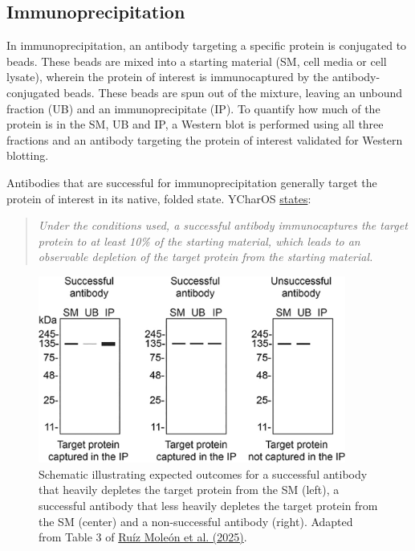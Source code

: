\documentclass[letterpaper, 12pt]{article}
\begin{document}
\pagebreak

\subsection*{Immunoprecipitation}

In immunoprecipitation, an antibody targeting a specific protein is conjugated to beads. These beads are mixed into a starting material (SM, cell media or cell lysate), wherein the protein of interest is immunocaptured by the antibody-conjugated beads. These beads are spun out of the mixture, leaving an unbound fraction (UB) and an immunoprecipitate (IP). To quantify how much of the protein is in the SM, UB and IP, a Western blot is performed using all three fractions and an antibody targeting the protein of interest validated for Western blotting.

Antibodies that are successful for immunoprecipitation generally target the protein of interest in its native, folded state. YCharOS \href{https://f1000research.com/gateways/ycharos/faqs}{states}:

\begin{quote}
    \textit{Under the conditions used, a successful antibody immunocaptures the target protein to at least 10\% of the starting material, which leads to an observable depletion of the target protein from the starting material.}
\end{quote}

\begin{figure}[h!tbp]
    \centering
    \includegraphics[width=0.9\textwidth]{img/antibody_val/ycharos_ip.jpg}
    \caption*{Schematic illustrating expected outcomes for a successful antibody that heavily depletes the target protein from the SM (left), a successful antibody that less heavily depletes the target protein from the SM (center) and a non-successful antibody (right). Adapted from Table 3 of \href{https://doi.org/10.12688/f1000research.155929.2}{Ru\'iz Mole\'on et al. (2025)}.}
\end{figure}
\end{document}
